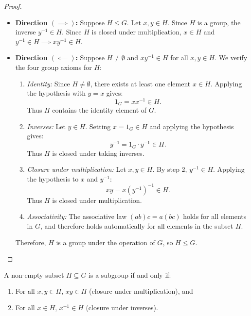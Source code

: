 \begin{proof}
\begin{itemize}[leftmargin=1.5em, itemsep=6pt]
    \item \textbf{Direction $(\implies)$:} Suppose $H \le G$. Let $x, y \in H$.
    Since $H$ is a group, the inverse $y^{-1} \in H$.
    Since $H$ is closed under multiplication, $x \in H$ and $y^{-1} \in H \implies xy^{-1} \in H$.
    
    \item \textbf{Direction $(\impliedby)$:} Suppose $H \ne \emptyset$ and $xy^{-1} \in H$ for all $x, y \in H$. We verify the four group axioms for $H$:
    \begin{enumerate}[label=\arabic*., leftmargin=*]
        \item \emph{Identity:} Since $H \ne \emptyset$, there exists at least one element $x \in H$.
        Applying the hypothesis with $y = x$ gives:
        \begin{equation*}
        1_G = xx^{-1} \in H.
        \end{equation*}
        Thus $H$ contains the identity element of $G$.
        
        \item \emph{Inverses:} Let $y \in H$. Setting $x = 1_G \in H$ and applying the hypothesis gives:
        \begin{equation*}
        y^{-1} = 1_G \cdot y^{-1} \in H.
        \end{equation*}
        Thus $H$ is closed under taking inverses.
        
        \item \emph{Closure under multiplication:} Let $x, y \in H$.
        By step 2, $y^{-1} \in H$.
        Applying the hypothesis to $x$ and $y^{-1}$:
        \begin{equation*}
        xy = x(y^{-1})^{-1} \in H.
        \end{equation*}
        Thus $H$ is closed under multiplication.
        
        \item \emph{Associativity:} The associative law $(ab)c = a(bc)$ holds for all elements in $G$, and therefore holds automatically for all elements in the subset $H$.
    \end{enumerate}
    Therefore, $H$ is a group under the operation of $G$, so $H \le G$.
\end{itemize}
\end{proof}

\begin{proposition}
\label{prop:subgroup_two_step}
A non-empty subset $H \subseteq G$ is a subgroup if and only if:
\begin{enumerate}[label=\textbf{(\arabic*)}, leftmargin=*, itemsep=4pt]
    \item For all $x, y \in H$, $xy \in H$ (closure under multiplication), and
    \item For all $x \in H$, $x^{-1} \in H$ (closure under inverses).
\end{enumerate}
\end{proposition}


